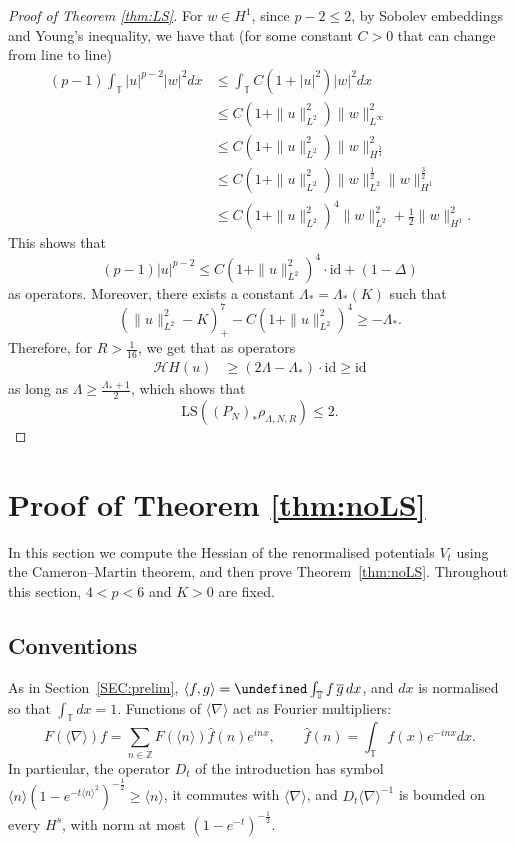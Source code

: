 \documentclass[letterpaper, 11pt,  reqno]{amsart}
\theoremstyle{definition}
\newcommand{\1}{\mathbbm 1}
\newcommand{\Z}{\mathbb{Z}}
\newcommand{\T}{\mathbb{T}}
\renewcommand{\H}{\mathcal H}
\newcommand{\0}{\mathbf 0}
\newcommand{\nb}{\nabla}
\newcommand{\Ld}{\Lambda}
\newcommand{\ft}{\widehat}
\newcommand{\cj}{\overline}
\newcommand{\jb}[1]
{\langle #1 \rangle}
\renewcommand{\H}{\mathcal{H}}
\renewcommand{\ft}{\widehat}
\numberwithin{equation}{section}
\numberwithin{theorem}{section}
\newcommand{\id}{\mathrm{id}}
\let\Re=\undefined\DeclareMathOperator*{\Re}{Re}
\begin{document}
\begin{proof}[Proof of Theorem \ref{thm:LS}]
 
 
 
    
    For $w \in H^1$, since $p -2 \le 2$, by Sobolev embeddings and Young's inequality, we have that 
    (for some constant $C > 0$ that can change from line to line)
\begin{align*}
(p-1) \int_\T |u|^{p-2}|w|^2 dx &\le \int_\T C(1 + |u|^2)|w|^2 dx\\
       &\le C(1 + \|u\|_{L^2}^2) \| w \|_{L^\infty}^2 \\
       &\le C(1 + \|u\|_{L^2}^2) \| w \|_{H^\frac 34}^ 2 \\
       &\le C(1 + \|u\|_{L^2}^2) \| w \|_{L^2}^{\frac12} \|w \|_{H^1}^{\frac 32} \\
       &\le C(1 + \|u\|_{L^2}^2)^4 \|w \|_{L^2}^2 + \frac 12 \|w \|_{H^1}^2.
    \end{align*}
    This shows that 
    $$ (p-1) |u|^{p-2}\le C(1 + \|u\|_{L^2}^2)^4 \cdot \id + (1-\Delta)$$
    as operators. Moreover, there exists a constant $\Ld_* = \Ld_*(K)$ such that 
    $$ (\|u\|_{L^2}^2 - K)_+^7 - C(1 + \|u\|_{L^2}^2)^4 \ge - \Ld_*.  $$
    Therefore, for $R > \frac 1 {16}$, we get that 
    as operators
    \begin{align*}
        \H H(u) &\ge (2 \Lambda - \Ld_*)\cdot \id \ge \id
    \end{align*}
    as long as $\Lambda \ge \frac{\Ld_* + 1}{2}$, which shows that 
    $$ \mathrm{LS}((P_N)_* \rho_{\Ld,N,R}) \le 2.$$
\end{proof}
\section{Proof of Theorem \ref{thm:noLS}}
\label{s4:SEC}
 
In this section we compute the Hessian of the renormalised potentials $V_t$ using
the Cameron--Martin theorem, and then prove Theorem~\ref{thm:noLS}. Throughout this section, $4< p<6$ and $K>0$ are fixed.
 
\subsection{Conventions}
 
As in Section~\ref{SEC:prelim},
$\jb{f,g}=\Re\int_\T f\,\cj g\,dx$, and $dx$ is normalised so that
$\int_\T dx=1$. Functions of $\jb\nb$ act as Fourier multipliers:
\[
F(\jb\nb)f=\sum_{n\in\Z}F(\jb n)\ft f(n)e^{inx},
\qquad \ft f(n)=\int_\T f(x)e^{-inx}dx .
\]
In particular, the operator $D_t$ of the introduction has symbol
$\jb n(1-e^{-t\jb n^2})^{-\frac12}\ge\jb n$, it commutes with $\jb\nb$, and $D_t\jb\nb^{-1}$ is
bounded on every $H^s$, with norm at most $(1-e^{-t})^{-\frac12}$.
 
\end{document}
